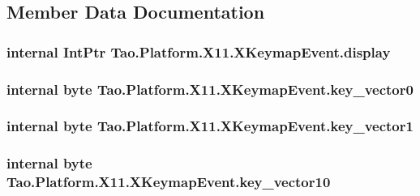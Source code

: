 \subsection{Member Data Documentation}
\hypertarget{struct_tao_1_1_platform_1_1_x11_1_1_x_keymap_event_ab9050a37131bac2be68a6d60d2d5ca31}{
\subsubsection[{display}]{\setlength{\rightskip}{0pt plus 5cm}internal IntPtr {\bf Tao.Platform.X11.XKeymapEvent.display}}}
\label{struct_tao_1_1_platform_1_1_x11_1_1_x_keymap_event_ab9050a37131bac2be68a6d60d2d5ca31}
\hypertarget{struct_tao_1_1_platform_1_1_x11_1_1_x_keymap_event_a9932c53b34b75556b532ecfb9b2ded3d}{
\subsubsection[{key\_\-vector0}]{\setlength{\rightskip}{0pt plus 5cm}internal byte {\bf Tao.Platform.X11.XKeymapEvent.key\_\-vector0}}}
\label{struct_tao_1_1_platform_1_1_x11_1_1_x_keymap_event_a9932c53b34b75556b532ecfb9b2ded3d}
\hypertarget{struct_tao_1_1_platform_1_1_x11_1_1_x_keymap_event_a4998914d5593a96047d6132c4041be70}{
\subsubsection[{key\_\-vector1}]{\setlength{\rightskip}{0pt plus 5cm}internal byte {\bf Tao.Platform.X11.XKeymapEvent.key\_\-vector1}}}
\label{struct_tao_1_1_platform_1_1_x11_1_1_x_keymap_event_a4998914d5593a96047d6132c4041be70}
\hypertarget{struct_tao_1_1_platform_1_1_x11_1_1_x_keymap_event_aa363e95a0797c6632a4217fd3c782cd7}{
\subsubsection[{key\_\-vector10}]{\setlength{\rightskip}{0pt plus 5cm}internal byte {\bf Tao.Platform.X11.XKeymapEvent.key\_\-vector10}}}
